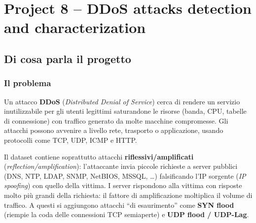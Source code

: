 \chapter{Project 8 -- DDoS attacks detection and characterization}

\begingroup %
\setlength{\parskip}{4pt}
\setlength{\parindent}{0pt}
\sloppy
\setlength{\emergencystretch}{3em}

\section{Di cosa parla il progetto}

\subsection{Il problema}
Un attacco \textbf{DDoS} (\emph{Distributed Denial of Service}) cerca di rendere
un servizio inutilizzabile per gli utenti legittimi saturandone le risorse
(banda, CPU, tabelle di connessione) con traffico generato da molte macchine
compromesse. Gli attacchi possono avvenire a livello rete, trasporto o
applicazione, usando protocolli come TCP, UDP, ICMP e HTTP.

Il dataset contiene soprattutto attacchi \textbf{riflessivi/amplificati}
(\emph{reflection/amplification}): l'attaccante invia piccole richieste a server
pubblici (DNS, NTP, LDAP, SNMP, NetBIOS, MSSQL, \dots) falsificando l'IP sorgente
(\emph{IP spoofing}) con quello della vittima. I server rispondono alla vittima
con risposte molto più grandi della richiesta: il fattore di amplificazione
moltiplica il volume di traffico. A questi si aggiungono attacchi ``di
esaurimento'' come \textbf{SYN flood} (riempie la coda delle connessioni TCP
semiaperte) e \textbf{UDP flood / UDP-Lag}.

